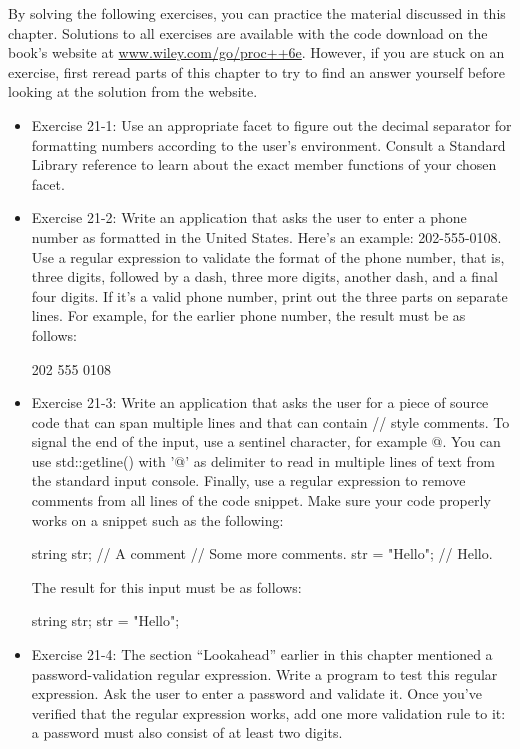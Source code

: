 By solving the following exercises, you can practice the material discussed in this chapter. Solutions to all exercises are available with the code download on the book’s website at \url{www.wiley.com/go/proc++6e}. However, if you are stuck on an exercise, first reread parts of this chapter to try to find an answer yourself before looking at the solution from the website.


\begin{itemize}
\item
Exercise 21-1: Use an appropriate facet to figure out the decimal separator for formatting numbers according to the user’s environment. Consult a Standard Library reference to learn about the exact member functions of your chosen facet.

\item
Exercise 21-2: Write an application that asks the user to enter a phone number as formatted in the United States. Here’s an example: 202-555-0108. Use a regular expression to validate the format of the phone number, that is, three digits, followed by a dash, three more digits, another dash, and a final four digits. If it’s a valid phone number, print out the three parts on separate lines. For example, for the earlier phone number, the result must be as follows:

\begin{shell}
202
555
0108
\end{shell}

\item
Exercise 21-3: Write an application that asks the user for a piece of source code that can span multiple lines and that can contain // style comments. To signal the end of the input, use a sentinel character, for example @. You can use std::getline() with '@' as delimiter to read in multiple lines of text from the standard input console. Finally, use a regular expression to remove comments from all lines of the code snippet. Make sure your code properly works on a snippet such as the following:

\begin{cpp}
string str; // A comment // Some more comments.
str = "Hello"; // Hello.
\end{cpp}

The result for this input must be as follows:

\begin{shell}
string str;
str = "Hello";
\end{shell}

\item
Exercise 21-4: The section “Lookahead” earlier in this chapter mentioned a password-validation regular expression. Write a program to test this regular expression. Ask the user to enter a password and validate it. Once you’ve verified that the regular expression works, add one more validation rule to it: a password must also consist of at least two digits.
\end{itemize}